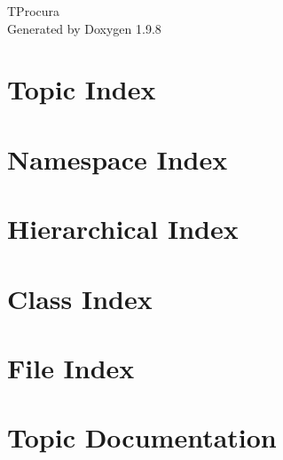 \documentclass[twoside]{book}
\newcommand{\+}{\discretionary{\mbox{\scriptsize$\hookleftarrow$}}{}{}}
\newcommand{\clearemptydoublepage}{%
    \newpage{\pagestyle{empty}\cleardoublepage}%
  }
\begin{document}
  \raggedbottom
    \hypersetup{pageanchor=false,
                bookmarksnumbered=true,
                pdfencoding=unicode
               }
  \begin{titlepage}
  \vspace*{7cm}
  \begin{center}%
  {\Large TProcura}\\
  \vspace*{1cm}
  {\large Generated by Doxygen 1.9.8}\\
  \end{center}
  \end{titlepage}
  \clearemptydoublepage
  \tableofcontents
  \clearemptydoublepage
  \hypersetup{pageanchor=true}










\chapter{Topic Index}

\chapter{Namespace Index}

\chapter{Hierarchical Index}

\chapter{Class Index}

\chapter{File Index}

\chapter{Topic Documentation}







\end{document}
